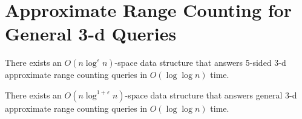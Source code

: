 \documentclass[anonymous,a4paper,USenglish,cleveref,autoref,thm-restate] {socg-lipics-v2021}
\newcommand{\eps}{\varepsilon}
\begin{document}
\section{Approximate Range Counting for General 3-d Queries}
\label{sec:label}
\begin{lemma}
  There exists an $O(n\log^{\eps}n)$-space data structure that answers 5-sided 3-d approximate range counting queries in $O(\log \log n)$ time. 
\end{lemma}

\begin{theorem}
  \label{theor:3d-approx}
  There exists an $O(n\log^{1+\eps}n)$-space data structure that answers general 3-d approximate range counting queries in $O(\log \log n)$ time. 
\end{theorem}
\end{document}
